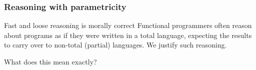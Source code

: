 \begin{frame}[fragile]
\frametitle{Reasoning with parametricity}
\begin{block}{Fast and loose reasoning is morally correct \cite{danielsson2006fast}}
\small{Functional programmers often reason about programs as if
they were written in a total language, expecting the results
to carry over to non-total (partial) languages. We justify
such reasoning.}
\end{block}
What does this mean exactly?
\end{frame}
